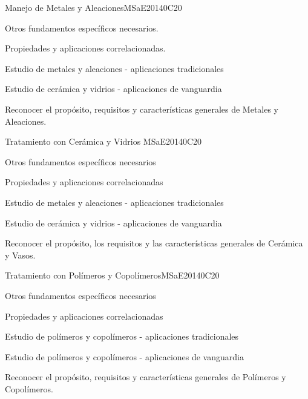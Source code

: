 \begin{syllabus}
\begin{unit}{Manejo de Metales y Aleaciones}{}{MSaE2014}{0}{C20}
\begin{topics}
      \item Otros fundamentos específicos necesarios.
      \item Propiedades y aplicaciones correlacionadas.
      \item Estudio de metales y aleaciones - aplicaciones tradicionales
      \item Estudio de cerámica y vidrios - aplicaciones de vanguardia
\end{topics}
   \begin{learningoutcomes}
      \item Reconocer el propósito, requisitos y características generales de Metales y Aleaciones.
   \end{learningoutcomes}
\end{unit}


\begin{unit}{Tratamiento con Cerámica y Vidrios }{}{MSaE2014}{0}{C20}
\begin{topics}
      \item Otros fundamentos específicos necesarios
      \item Propiedades y aplicaciones correlacionadas
      \item Estudio de metales y aleaciones - aplicaciones tradicionales
      \item Estudio de cerámica y vidrios - aplicaciones de vanguardia
\end{topics}
   \begin{learningoutcomes}

      \item Reconocer el propósito, los requisitos y las características generales de Cerámica y Vasos.
   \end{learningoutcomes}
\end{unit}

\begin{unit}{Tratamiento con Polímeros y Copolímeros}{}{MSaE2014}{0}{C20}
\begin{topics}
      \item Otros fundamentos específicos necesarios
      \item Propiedades y aplicaciones correlacionadas
      \item Estudio de polímeros y copolímeros - aplicaciones tradicionales
      \item Estudio de polímeros y copolímeros - aplicaciones de vanguardia
\end{topics}
   \begin{learningoutcomes}
      \item Reconocer el propósito, requisitos y características generales de Polímeros y Copolímeros.
   \end{learningoutcomes}
\end{unit}


\end{syllabus}
